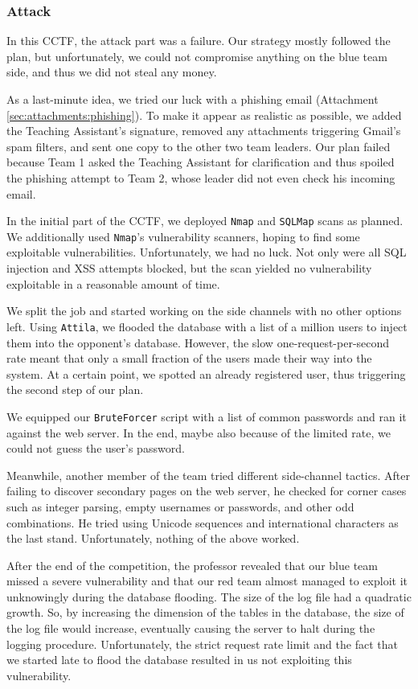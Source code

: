 \subsubsection{Attack}
\label{sec:cctf-secure:exec:att}
 
In this CCTF, the attack part was a failure. Our strategy mostly followed the plan, but unfortunately, we could not compromise anything on the blue team side, and thus we did not steal any money.

As a last-minute idea, we tried our luck with a phishing email (Attachment \ref{sec:attachments:phishing}). To make it appear as realistic as possible, we added the Teaching Assistant's signature, removed any attachments triggering Gmail's spam filters, and sent one copy to the other two team leaders. Our plan failed because Team 1 asked the Teaching Assistant for clarification and thus spoiled the phishing attempt to Team 2, whose leader did not even check his incoming email.

In the initial part of the CCTF, we deployed \texttt{Nmap} and \texttt{SQLMap} scans as planned. We additionally used \texttt{Nmap}'s vulnerability scanners, hoping to find some exploitable vulnerabilities. Unfortunately, we had no luck. Not only were all SQL injection and XSS attempts blocked, but the scan yielded no vulnerability exploitable in a reasonable amount of time.

We split the job and started working on the side channels with no other options left. Using \texttt{Attila}, we flooded the database with a list of a million users to inject them into the opponent's database. However, the slow one-request-per-second rate meant that only a small fraction of the users made their way into the system. At a certain point, we spotted an already registered user, thus triggering the second step of our plan.

We equipped our \texttt{BruteForcer} script with a list of common passwords and ran it against the web server. In the end, maybe also because of the limited rate, we could not guess the user's password.

Meanwhile, another member of the team tried different side-channel tactics. After failing to discover secondary pages on the web server, he checked for corner cases such as integer parsing, empty usernames or passwords, and other odd combinations.
He tried using Unicode sequences and international characters as the last stand. Unfortunately, nothing of the above worked.

After the end of the competition, the professor revealed that our blue team missed a severe vulnerability and that our red team almost managed to exploit it unknowingly during the database flooding. 
The size of the log file had a quadratic growth. So, by increasing the dimension of the tables in the database, the size of the log file would increase, eventually causing the server to halt during the logging procedure. Unfortunately, the strict request rate limit and the fact that we started late to flood the database resulted in us not exploiting this vulnerability.

